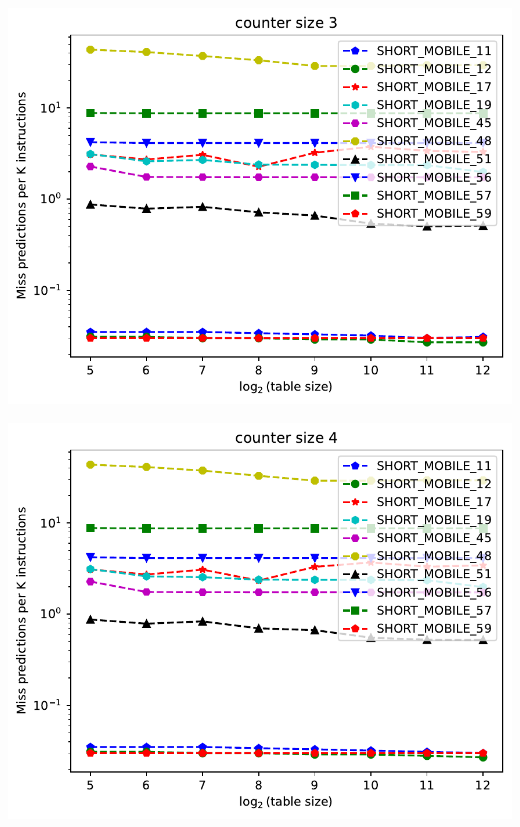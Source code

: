 \documentclass[a4paper]{article}
\begin{document}
\begin{minipage}{.48\linewidth}
\includegraphics[width=\linewidth]{perceptron/graph_3}
\end{minipage}%
\hfill
\begin{minipage}{.48\linewidth}
\includegraphics[width=\linewidth]{perceptron/graph_4}
\end{minipage}
\end{document}
